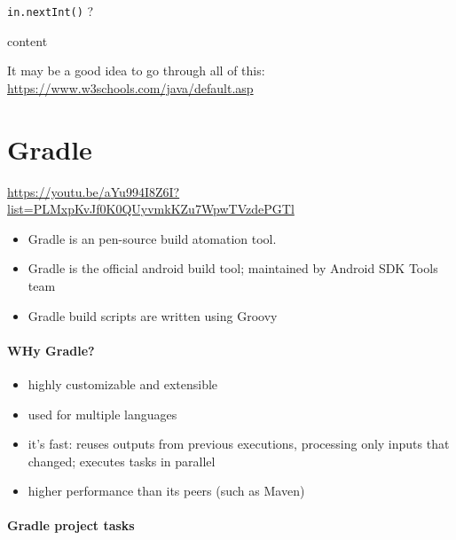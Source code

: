 \begin{quest}
\item
	\texttt{in.nextInt()} ?

\begin{ans}
content
\end{ans}

\end{quest}




It may be a good idea to go through all of this: \url{https://www.w3schools.com/java/default.asp}


\section{Gradle}

\url{https://youtu.be/aYu994I8Z6I?list=PLMxpKvJf0K0QUyvmkKZu7WpwTVzdePGTl}

\begin{itemize}
\item Gradle is an pen-source build atomation tool.
\item Gradle is the official android build tool; maintained by Android SDK Tools team
\item Gradle build scripts are written using Groovy
\end{itemize}


\paragraph*{WHy Gradle?}
\begin{itemize}
\item highly customizable and extensible
\item used for multiple languages
\item it's fast: reuses outputs from previous executions, processing only inputs that changed; executes tasks in parallel
\item higher performance than its peers (such as Maven)

\end{itemize}

\paragraph*{Gradle project tasks}



